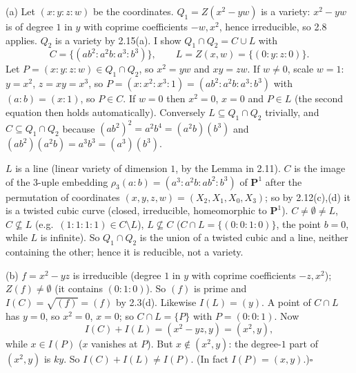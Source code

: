 \documentclass[11pt]{article}
\begin{document}
\pf
(a) Let $(x:y:z:w)$ be the coordinates. $Q_1=Z(x^2-yw)$ is a variety: $x^2-yw$ is of degree $1$ in $y$ with coprime coefficients $-w,x^2$, hence irreducible, so 2.8 applies. $Q_2$ is a variety by 2.15(a). I show $Q_1\cap Q_2=C\cup L$ with
\[
C=\{(ab^2:a^2b:a^3:b^3)\},\qquad L=Z(x,w)=\{(0:y:z:0)\}.
\]
Let $P=(x:y:z:w)\in Q_1\cap Q_2$, so $x^2=yw$ and $xy=zw$. If $w\ne0$, scale $w=1$: $y=x^2$, $z=xy=x^3$, so $P=(x:x^2:x^3:1)=(ab^2:a^2b:a^3:b^3)$ with $(a:b)=(x:1)$, so $P\in C$. If $w=0$ then $x^2=0$, $x=0$ and $P\in L$ (the second equation then holds automatically). Conversely $L\subseteq Q_1\cap Q_2$ trivially, and $C\subseteq Q_1\cap Q_2$ because $(ab^2)^2=a^2b^4=(a^2b)(b^3)$ and $(ab^2)(a^2b)=a^3b^3=(a^3)(b^3)$.

$L$ is a line (linear variety of dimension $1$, by the Lemma in 2.11). $C$ is the image of the 3-uple embedding $\rho_3(a:b)=(a^3:a^2b:ab^2:b^3)$ of $\mathbf P^1$ after the permutation of coordinates $(x,y,z,w)=(X_2,X_1,X_0,X_3)$; so by 2.12(c),(d) it is a twisted cubic curve (closed, irreducible, homeomorphic to $\mathbf P^1$). $C\ne\emptyset\ne L$, $C\not\subseteq L$ (e.g.\ $(1:1:1:1)\in C\setminus L$), $L\not\subseteq C$ ($C\cap L=\{(0:0:1:0)\}$, the point $b=0$, while $L$ is infinite). So $Q_1\cap Q_2$ is the union of a twisted cubic and a line, neither containing the other; hence it is reducible, not a variety.

(b) $f=x^2-yz$ is irreducible (degree $1$ in $y$ with coprime coefficients $-z,x^2$); $Z(f)\ne\emptyset$ (it contains $(0:1:0)$). So $(f)$ is prime and $I(C)=\sqrt{(f)}=(f)$ by 2.3(d). Likewise $I(L)=(y)$. A point of $C\cap L$ has $y=0$, so $x^2=0$, $x=0$; so $C\cap L=\{P\}$ with $P=(0:0:1)$. Now
\[
I(C)+I(L)=(x^2-yz,y)=(x^2,y),
\]
while $x\in I(P)$ ($x$ vanishes at $P$). But $x\notin(x^2,y)$: the degree-$1$ part of $(x^2,y)$ is $ky$. So $I(C)+I(L)\ne I(P)$. (In fact $I(P)=(x,y)$.)\hfill$\square$
\end{document}
